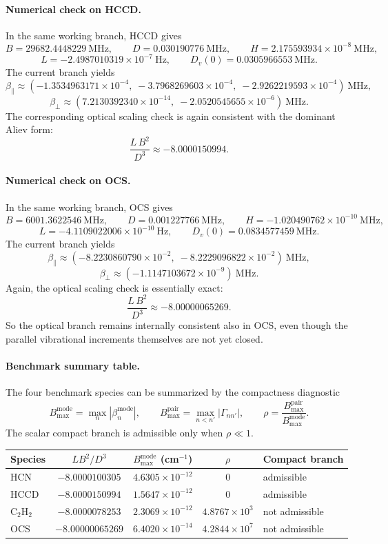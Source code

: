 \documentclass[11pt]{article}
\begin{document}
\paragraph{Numerical check on HCCD.}
In the same working branch, HCCD gives
\[
B = 29682.4448229\ \mathrm{MHz},
\qquad
D = 0.030190776\ \mathrm{MHz},
\qquad
H = 2.175593934\times 10^{-8}\ \mathrm{MHz},
\]
\[
L = -2.4987010319\times 10^{-7}\ \mathrm{Hz},
\qquad
D_v(0)=0.0305966553\ \mathrm{MHz}.
\]
The current branch yields
\[
\beta_{\parallel}\approx
(-1.3534963171\times 10^{-4},\;
-3.7968269603\times 10^{-4},\;
-2.9262219593\times 10^{-4})\ \mathrm{MHz},
\]
\[
\beta_{\perp}\approx
(7.2130392340\times 10^{-14},\;
-2.0520545655\times 10^{-6})\ \mathrm{MHz}.
\]
The corresponding optical scaling check is again consistent with the dominant
Aliev form:
\[
\frac{L\,B^2}{D^3}\approx -8.0000150994.
\]

\paragraph{Numerical check on OCS.}
In the same working branch, OCS gives
\[
B = 6001.3622546\ \mathrm{MHz},
\qquad
D = 0.001227766\ \mathrm{MHz},
\qquad
H = -1.020490762\times 10^{-10}\ \mathrm{MHz},
\]
\[
L = -4.1109022006\times 10^{-10}\ \mathrm{Hz},
\qquad
D_v(0)=0.0834577459\ \mathrm{MHz}.
\]
The current branch yields
\[
\beta_{\parallel}\approx
(-8.2230860790\times 10^{-2},\;
-8.2229096822\times 10^{-2})\ \mathrm{MHz},
\]
\[
\beta_{\perp}\approx
(-1.1147103672\times 10^{-9})\ \mathrm{MHz}.
\]
Again, the optical scaling check is essentially exact:
\[
\frac{L\,B^2}{D^3}\approx -8.00000065269.
\]
So the optical branch remains internally consistent also in OCS, even though
the parallel vibrational increments themselves are not yet closed.

\paragraph{Benchmark summary table.}
The four benchmark species can be summarized by the compactness diagnostic
\[
B_{\max}^{\mathrm{mode}}=\max_n |\beta_n^{\mathrm{mode}}|,
\qquad
B_{\max}^{\mathrm{pair}}=\max_{n<n'} |\Gamma_{nn'}|,
\qquad
\rho=\frac{B_{\max}^{\mathrm{pair}}}{B_{\max}^{\mathrm{mode}}}.
\]
The scalar compact branch is admissible only when $\rho\ll1$.

\begin{center}
\begin{tabular}{lcccl}
\toprule
Species & $L B^2/D^3$ & $B_{\max}^{\mathrm{mode}}$ (cm$^{-1}$) & $\rho$ & Compact branch \\
\midrule
HCN & $-8.0000100305$ & $4.6305\times10^{-12}$ & $0$ & admissible \\
HCCD & $-8.0000150994$ & $1.5647\times10^{-12}$ & $0$ & admissible \\
C$_2$H$_2$ & $-8.0000078253$ & $2.3069\times10^{-12}$ & $4.8767\times10^{3}$ & not admissible \\
OCS & $-8.00000065269$ & $6.4020\times10^{-14}$ & $4.2844\times10^{7}$ & not admissible \\
\bottomrule
\end{tabular}
\end{center}
\end{document}
